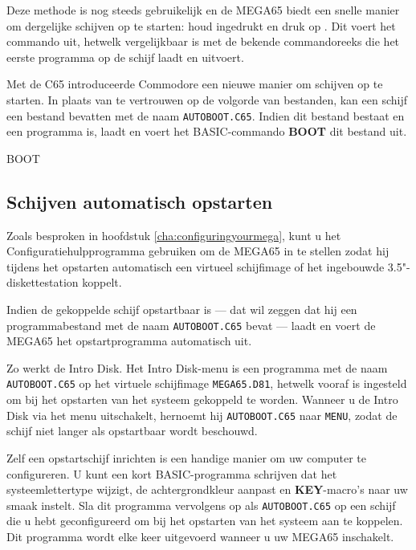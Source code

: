 Deze methode is nog steeds gebruikelijk en de MEGA65 biedt een snelle manier om dergelijke schijven op te starten: houd  ingedrukt en druk op . Dit voert het commando  uit, hetwelk vergelijkbaar is met de bekende commandoreeks die het eerste programma op de schijf laadt en uitvoert.

Met de C65 introduceerde Commodore een nieuwe manier om schijven op te starten. In plaats van te vertrouwen op de volgorde van bestanden, kan een schijf een bestand bevatten met de naam {\tt AUTOBOOT.C65}. Indien dit bestand bestaat en een programma is, laadt en voert het BASIC-commando {\bf BOOT} dit bestand uit.

\begin{screencode}
BOOT
\end{screencode}

\subsection{Schijven automatisch opstarten}

Zoals besproken in hoofdstuk \vref{cha:configuringyourmega}, kunt u het Configuratiehulpprogramma gebruiken om de MEGA65 in te stellen zodat hij tijdens het opstarten automatisch een virtueel schijfimage of het ingebouwde 3.5"-diskettestation koppelt.

Indien de gekoppelde schijf opstartbaar is --- dat wil zeggen dat hij een programmabestand met de naam {\tt AUTOBOOT.C65} bevat --- laadt en voert de MEGA65 het opstartprogramma automatisch uit.

Zo werkt de Intro Disk. Het Intro Disk-menu is een programma met de naam {\tt AUTOBOOT.C65} op het virtuele schijfimage {\tt MEGA65.D81}, hetwelk vooraf is ingesteld om bij het opstarten van het systeem gekoppeld te worden. Wanneer u de Intro Disk via het menu uitschakelt, hernoemt hij {\tt AUTOBOOT.C65} naar {\tt MENU}, zodat de schijf niet langer als opstartbaar wordt beschouwd.

Zelf een opstartschijf inrichten is een handige manier om uw computer te configureren. U kunt een kort BASIC-programma schrijven dat het systeemlettertype wijzigt, de achtergrondkleur aanpast en {\bf KEY}-macro's naar uw smaak instelt. Sla dit programma vervolgens op als {\tt AUTOBOOT.C65} op een schijf die u hebt geconfigureerd om bij het opstarten van het systeem aan te koppelen. Dit programma wordt elke keer uitgevoerd wanneer u uw MEGA65 inschakelt.


